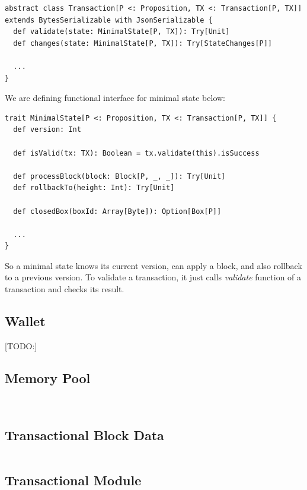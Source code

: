 \documentclass[]{report}   %
\begin{document}
\begin{lstlisting}
abstract class Transaction[P <: Proposition, TX <: Transaction[P, TX]] extends BytesSerializable with JsonSerializable {
  def validate(state: MinimalState[P, TX]): Try[Unit]
  def changes(state: MinimalState[P, TX]): Try[StateChanges[P]]

  ...
}
\end{lstlisting}

We are defining functional interface for minimal state below:

\begin{lstlisting}
trait MinimalState[P <: Proposition, TX <: Transaction[P, TX]] {
  def version: Int

  def isValid(tx: TX): Boolean = tx.validate(this).isSuccess

  def processBlock(block: Block[P, _, _]): Try[Unit]
  def rollbackTo(height: Int): Try[Unit]

  def closedBox(boxId: Array[Byte]): Option[Box[P]]

  ...
}
\end{lstlisting}

So a minimal state knows its current version, can apply a block, and also rollback to a previous version. To validate a transaction, it just calls \textit{validate} function of a transaction and checks its result.

\subsection{Wallet}

[TODO:]

\subsection{Memory Pool}

\begin{lstlisting}


\end{lstlisting}

\subsection{Transactional Block Data}

\begin{lstlisting}

\end{lstlisting}

\subsection{Transactional Module}
\end{document}
